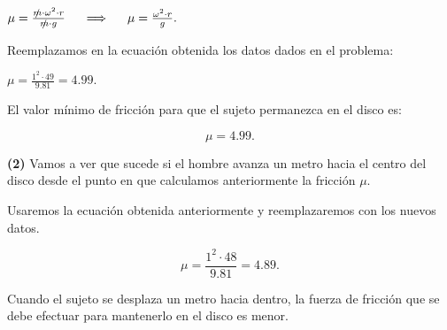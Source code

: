 \documentclass[a4paper,12pt]{article} %
\begin{document}
\vspace{\baselineskip}

\begin{center}
    \( \mu = \frac{\slashed{m} \cdot \omega^2 \cdot r }{\slashed{m} \cdot g}\hspace{0.5 cm}  \Longrightarrow \hspace{0.5 cm} \mu = \frac{\omega^2 \cdot r}{g}.\)
\end{center}

\vspace{\baselineskip}

\begin{justify}
    Reemplazamos en la ecuación obtenida los datos dados en el problema: 
\end{justify}

\begin{center}
    \(\mu = \frac{1^2 \cdot 49}{9.81} = 4.99.\)
\end{center}

\vspace{\baselineskip}

\begin{justify}
    El valor mínimo de fricción para que el sujeto permanezca en el disco es:
\end{justify}

\begin{center}
    \[
    \boxed{\mu = 4.99.}
    \]
\end{center}

\newpage

\begin{justify}
    \textbf{(2)} Vamos a ver que sucede si el hombre avanza un metro hacia el centro del disco desde el punto en que calculamos anteriormente la fricción \(\mu.\)
\end{justify}

\begin{justify}
    Usaremos la ecuación obtenida anteriormente y reemplazaremos con los nuevos datos.
\end{justify}

\begin{center}
    \[
    \boxed{\mu = \frac{1^2 \cdot 48}{9.81} = 4.89.}
    \]
\end{center}

\begin{justify}
    Cuando el sujeto se desplaza un metro hacia dentro, la fuerza de fricción que se debe efectuar para mantenerlo en el disco es menor.
\end{justify}
\end{document}
